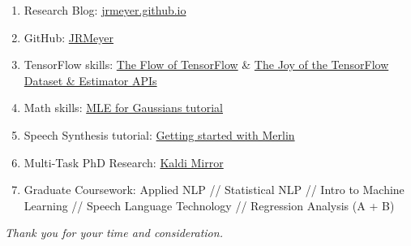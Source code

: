 \documentclass[12pt,a4paper]{article}
\begin{document}
\begin{enumerate}

\item Research Blog: \href{http://jrmeyer.github.io}{jrmeyer.github.io}

\item GitHub: \href{https://github.com/JRMeyer}{JRMeyer}
  
\item TensorFlow skills: \href{http://jrmeyer.github.io/machinelearning/2016/02/01/TensorFlow-Tutorial.html}{The Flow of TensorFlow} \& \href{http://jrmeyer.github.io/machinelearning/2019/05/29/tensorflow-dataset-estimator-api.html}{The Joy of the TensorFlow Dataset \& Estimator APIs}
  
\item Math skills: \href{http://jrmeyer.github.io/machinelearning/2017/08/18/mle.html}{MLE for Gaussians tutorial}

\item Speech Synthesis tutorial: \href{http://jrmeyer.github.io/tts/2017/02/14/Installing-Merlin.html}{Getting started with Merlin}

\item Multi-Task PhD Research: \href{https://github.com/JRMeyer/kaldi-mirror/tree/master/egs/kgz/kyrgyz-model}{Kaldi Mirror}
  
\item Graduate Coursework: Applied NLP // Statistical NLP // Intro to Machine Learning // Speech Language Technology // Regression Analysis (A + B)


\end{enumerate}

    
\begin{center}
\textit{Thank you for your time and consideration.}  
\end{center}
\end{document}
